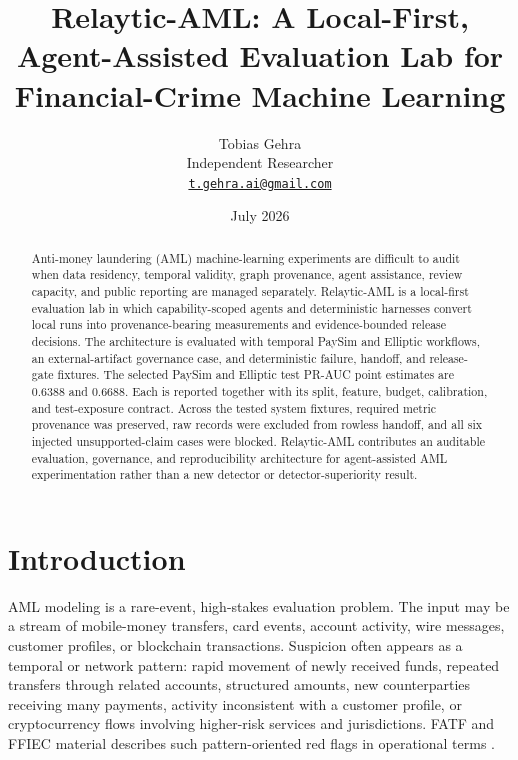 \documentclass[11pt]{article}
\title{Relaytic-AML: A Local-First, Agent-Assisted Evaluation Lab for Financial-Crime Machine Learning}
\author{Tobias Gehra\\Independent Researcher\\\href{mailto:t.gehra.ai@gmail.com}{\texttt{t.gehra.ai@gmail.com}}}
\date{July 2026}
\begin{document}
\maketitle


\begin{abstract}

Anti-money laundering (AML) machine-learning experiments are difficult to audit when data residency, temporal validity, graph provenance, agent assistance, review capacity, and public reporting are managed separately. Relaytic-AML is a local-first evaluation lab in which capability-scoped agents and deterministic harnesses convert local runs into provenance-bearing measurements and evidence-bounded release decisions. The architecture is evaluated with temporal PaySim and Elliptic workflows, an external-artifact governance case, and deterministic failure, handoff, and release-gate fixtures. The selected PaySim and Elliptic test PR-AUC point estimates are 0.6388 and 0.6688. Each is reported together with its split, feature, budget, calibration, and test-exposure contract. Across the tested system fixtures, required metric provenance was preserved, raw records were excluded from rowless handoff, and all six injected unsupported-claim cases were blocked. Relaytic-AML contributes an auditable evaluation, governance, and reproducibility architecture for agent-assisted AML experimentation rather than a new detector or detector-superiority result.

\end{abstract}

\section{Introduction}

AML modeling is a rare-event, high-stakes evaluation problem. The input may be a stream of mobile-money transfers, card events, account activity, wire messages, customer profiles, or blockchain transactions. Suspicion often appears as a temporal or network pattern: rapid movement of newly received funds, repeated transfers through related accounts, structured amounts, new counterparties receiving many payments, activity inconsistent with a customer profile, or cryptocurrency flows involving higher-risk services and jurisdictions. FATF and FFIEC material describes such pattern-oriented red flags in operational terms \citep{fatf2020virtualassets,ffiecRedFlags}.
\end{document}
